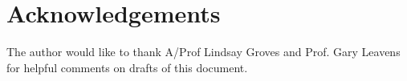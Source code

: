 \section*{Acknowledgements}
The author would like to thank A/Prof Lindsay Groves and Prof. Gary
Leavens for helpful comments on drafts of this document.
